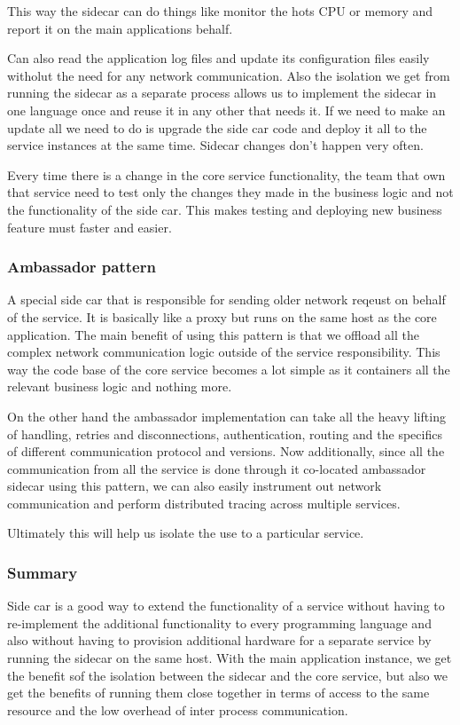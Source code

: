 This way the sidecar can do things like monitor the hots CPU or memory and report it on the main applications behalf.

Can also read the application log files and update its configuration files easily witholut the need for any network communication.
Also the isolation we get from running the sidecar as a separate process allows us to implement the sidecar in one language once and reuse it in any other that needs it.
If we need to make an update all we need to do is upgrade the side car code and deploy it all to the service instances at the same time.
Sidecar changes don't happen very often.

Every time there is a change in the core service functionality, the team that own that service need to test only the changes they made in the business logic and not the functionality of the side car.
This makes testing and deploying new business feature must faster and easier.

\subsubsection{Ambassador pattern}
A special side car that is responsible for sending older network reqeust on behalf of the service.
It is basically like a proxy but runs on the same host as the core application.
The main benefit of using this pattern is that we offload all the complex network communication logic outside of the service responsibility.
This way the code base of the core service becomes a lot simple as it containers all the relevant business logic and nothing more.

On the other hand the ambassador implementation can take all the heavy lifting of handling, retries and disconnections, authentication, routing and the specifics of different communication protocol and versions.
Now additionally, since all the communication from all the service is done through it co-located ambassador sidecar using this pattern, we can also easily instrument out network communication and perform distributed tracing across multiple services.

Ultimately this will help us isolate the use to a particular service.

\subsubsection{Summary}
Side car is a good way to extend the functionality of a service without having to re-implement the additional functionality to every programming language and also without having to provision additional hardware for a separate service by running the sidecar on the same host.
With the main application instance, we get the benefit sof the isolation between the sidecar and the core service, but also we get the benefits of running them close together in terms of access to the same resource and the low overhead of inter process communication.


